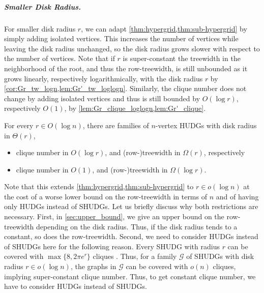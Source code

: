 \documentclass[a4paper,english,cleveref,thm-restate]{lipics-v2021}
\newcommand{\calG}{\ensuremath{\mathcal{G}}\xspace}
\begin{document}
% 


\subparagraph{Smaller Disk Radius.}

For smaller disk radius $r$, we can adapt \cref{thm:hypergrid,thm:sub-hypergrid} by simply adding isolated vertices.
This increases the number of vertices while leaving the disk radius unchanged, so the disk radius grows slower with respect to the number of vertices.
Note that if $ r $ is super-constant the treewidth in the neighborhood of the root, and thus the row-treewidth, is still unbounded as it grows linearly, respectively logarithmically, with the disk radius $ r $ by \cref{cor:Gr_tw_logn,lem:Gr'_tw_loglogn}.
Similarly, the clique number does not change by adding isolated vertices and thus is still bounded by $ O(\log r) $, respectively $ O(1) $, by \cref{lem:Gr_clique_loglogn,lem:Gr'_clique}.

\begin{corollary}
    \label{cor:lower-bound-sub-log-radius}
    For every $r \in O(\log n)$, there are families of $n$-vertex HUDGs with disk radius in $\Theta(r)$, 
    \begin{itemize}
        \item clique number in $ O(\log r) $, and (row-)treewidth in $ \Omega(r) $, respectively
        \item clique number in $ O(1) $, and (row-)treewidth in $ \Omega(\log r) $.
    \end{itemize}

\end{corollary}

Note that this extends \cref{thm:hypergrid,thm:sub-hypergrid} to $ r \in o(\log n) $ at the cost of a worse lower bound on the row-treewidth in terms of $ n $ and of having only HUDGs instead of SHUDGs.
Let us briefly discuss why both restrictions are necessary.
First, in \cref{sec:upper_bound}, we give an upper bound on the row-treewidth depending on the disk radius.
Thus, if the disk radius tends to a constant, so does the row-treewidth.
%
Second, we need to consider HUDGs instead of SHUDGs here for the following reason.
Every SHUDG with radius $ r $ can be covered with $\max\{8, 2\pi e^r\}$ cliques \cite[Lemma~8]{blasius_strongly_2023}.
Thus, for a family $\calG$ of SHUDGs with disk radius $r \in o(\log n)$, the graphs in $\calG$ can be covered with $o(n)$ cliques, implying super-constant clique number.  Thus, to get constant clique number, we have to consider HUDGs instead of SHUDGs.
\end{document}
